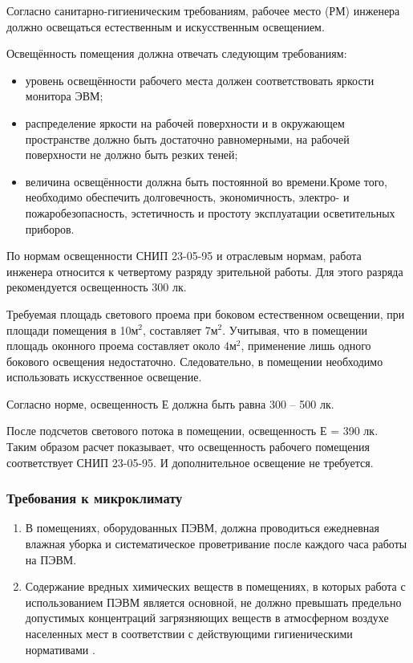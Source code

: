 Согласно санитарно-гигиеническим требованиям, рабочее место (РМ) инженера должно освещаться естественным и искусственным освещением.

Освещённость помещения должна отвечать следующим требованиям:
\begin{itemize}
  \item  уровень освещённости рабочего места должен соответствовать яркости монитора ЭВМ;
  \item  распределение яркости на рабочей поверхности и в окружающем пространстве должно быть достаточно равномерными, на рабочей поверхности не должно быть резких теней;
  \item  величина освещённости должна быть постоянной во времени.Кроме того, необходимо обеспечить долговечность, экономичность, электро- и пожаробезопасность, эстетичность и простоту эксплуатации осветительных приборов.
\end{itemize}

По нормам освещенности СНИП 23-05-95 и отраслевым нормам, работа инженера относится к четвертому разряду зрительной работы. Для этого разряда рекомендуется освещенность 300 лк. 

Требуемая площадь светового проема при боковом естественном освещении, при площади помещения в 10м$^2$, составляет 7м$^2$. Учитывая, что в помещении площадь оконного проема составляет около 4м$^2$, применение лишь одного бокового освещения недостаточно. Следовательно, в помещении необходимо использовать искусственное освещение. 

Согласно норме, освещенность Е должна быть равна 300 – 500 лк. 

После подсчетов светового потока в помещении, освещенность Е = 390 лк. Таким образом расчет показывает, что освещенность рабочего помещения соответствует СНИП 23-05-95. И дополнительное освещение не требуется.

\subsubsection{Требования к микроклимату}
\begin{enumerate}
\item В помещениях, оборудованных ПЭВМ, должна проводиться ежедневная влажная уборка и систематическое проветривание после каждого часа работы на ПЭВМ.
\item Содержание вредных химических веществ в помещениях, в которых работа с использованием ПЭВМ является основной, не должно превышать предельно допустимых концентраций загрязняющих веществ в атмосферном воздухе населенных мест в соответствии с действующими гигиеническими нормативами \cite{bhzd_2}.
\end{enumerate}
